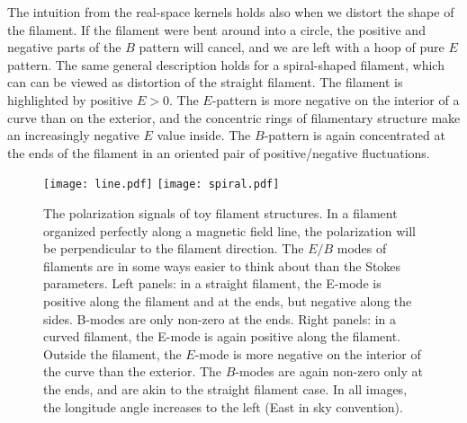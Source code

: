 The intuition from the real-space kernels holds also when we distort the shape of the filament.  If the filament were bent around into a circle, the positive and negative parts of the $B$ pattern will cancel, and we are left with a hoop of pure $E$ pattern.  The same general description holds for a spiral-shaped filament, which can can be viewed as distortion of the straight filament.  The filament is highlighted by positive $E>0$.  The $E$-pattern is more negative on the interior of a curve than on the exterior, and the concentric rings of filamentary structure make an increasingly negative $E$ value inside.  The $B$-pattern is again concentrated at the ends of the filament in an oriented pair of positive/negative fluctuations.
 
 
\begin{figure}
  \texttt{[image: line.pdf]}
  \texttt{[image: spiral.pdf]}
  \caption{
    The polarization signals of toy filament structures.
    In a filament organized perfectly along a magnetic field line, the polarization will be perpendicular to the filament direction.  The $E/B$ modes of filaments are in some ways easier to think about than the Stokes parameters.
    Left panels: in a straight filament, the E-mode is positive along the filament and at the ends, but negative along the sides.  B-modes are only non-zero at the ends.  Right panels: in a curved filament, the E-mode is again positive along the filament.  Outside the filament, the $E$-mode is more negative on the interior of the curve than the exterior.  The $B$-modes are again non-zero only at the ends, and are akin to the straight filament case.
    In all images, the longitude angle increases to the left (East in sky convention).}
  \label{fig:polfilaments}
\end{figure}




 

